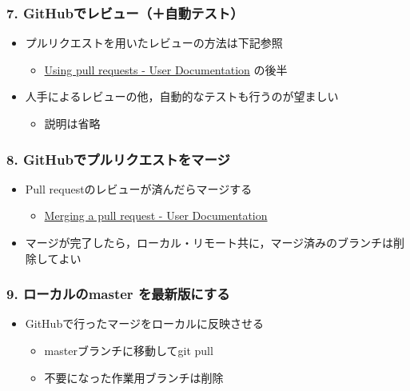 \documentclass[a4paper,twoside,twocolumn]{bxjsarticle}
\begin{document}
\subsubsection{7. GitHubでレビュー（＋自動テスト）}
\label{sec-2-3-8}
\begin{itemize}
\item プルリクエストを用いたレビューの方法は下記参照
\begin{itemize}
\item \href{https://help.github.com/articles/using-pull-requests/}{Using pull requests - User Documentation} の後半
\end{itemize}
\item 人手によるレビューの他，自動的なテストも行うのが望ましい
\begin{itemize}
\item 説明は省略
\end{itemize}
\end{itemize}

\subsubsection{8. GitHubでプルリクエストをマージ}
\label{sec-2-3-9}
\begin{itemize}
\item Pull requestのレビューが済んだらマージする
\begin{itemize}
\item \href{https://help.github.com/articles/merging-a-pull-request/}{Merging a pull request - User Documentation}
\end{itemize}
\item マージが完了したら，ローカル・リモート共に，マージ済みのブランチは削除してよい
\end{itemize}

\subsubsection{9. ローカルのmaster を最新版にする}
\label{sec-2-3-10}

\begin{itemize}
\item GitHubで行ったマージをローカルに反映させる
\begin{itemize}
\item masterブランチに移動してgit pull
\item 不要になった作業用ブランチは削除
\end{itemize}
\end{itemize}
\end{document}

